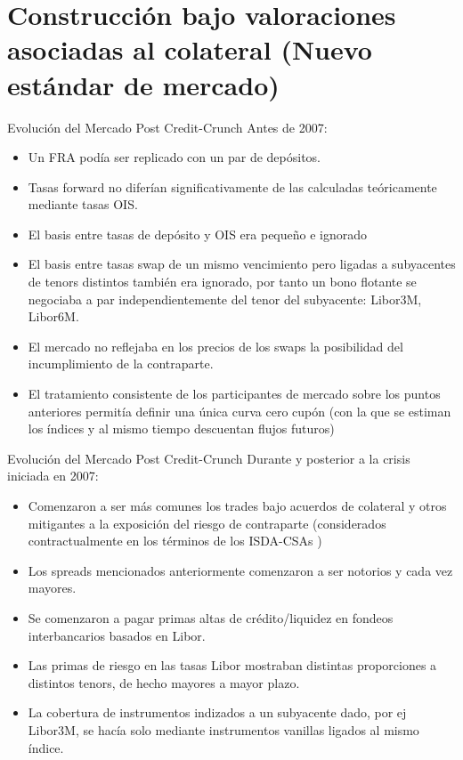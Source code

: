 \documentclass[11pt]{beamer}
\begin{document}
\section{Construcción bajo valoraciones asociadas al colateral (Nuevo estándar de mercado)}
\begin{frame}{Evolución del Mercado Post Credit-Crunch}
Antes de 2007:
	\begin{itemize}
		\item Un FRA podía ser replicado con un par de depósitos.
		\item	Tasas forward no diferían significativamente de las calculadas teóricamente mediante tasas OIS.
	\item	El basis entre tasas de depósito y OIS era pequeño e ignorado
	\item	El basis entre tasas swap de un mismo vencimiento pero ligadas a subyacentes de tenors distintos también era ignorado, por tanto un bono flotante se negociaba a par independientemente del tenor del subyacente: Libor3M, Libor6M.
	\item El mercado no reflejaba en los precios de los swaps la posibilidad del incumplimiento de la contraparte.
		
	\item	El tratamiento consistente de los participantes de mercado sobre los puntos  anteriores permitía definir una única curva cero cupón (con la que se estiman los índices y al mismo tiempo descuentan flujos futuros)
	\end{itemize}
\end{frame}

\begin{frame}{Evolución del Mercado Post Credit-Crunch}
	Durante y posterior a la crisis iniciada en 2007:
	
	\begin{itemize}
		\item Comenzaron a ser más comunes los trades bajo acuerdos de colateral y otros mitigantes a la exposición del riesgo de contraparte (considerados contractualmente en los términos de los ISDA-CSAs )
		\item Los spreads mencionados anteriormente comenzaron a ser notorios y cada vez mayores.
		\item Se comenzaron a pagar primas altas de crédito/liquidez en fondeos interbancarios basados en Libor.
		\item Las primas  de riesgo en las tasas Libor mostraban distintas proporciones a distintos tenors, de hecho mayores a mayor plazo.
		\item La cobertura de instrumentos indizados a un subyacente dado, por ej Libor3M, se hacía solo mediante instrumentos vanillas ligados al mismo índice.
		
	\end{itemize}
\end{frame}
\end{document}
